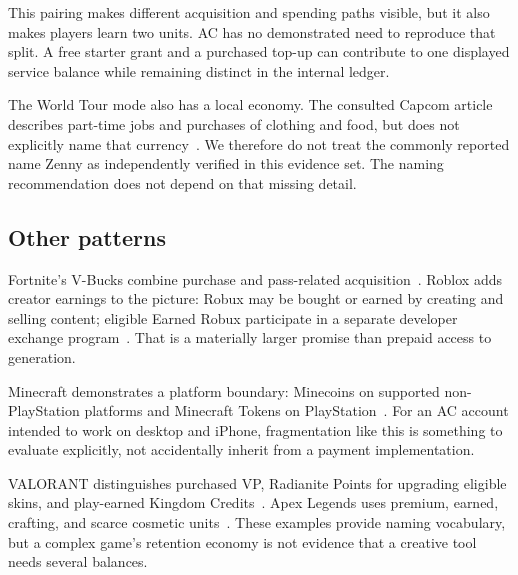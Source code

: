 \documentclass[10pt,letterpaper,twocolumn]{article}
\begin{document}
This pairing makes different acquisition and spending paths visible, but it also makes players learn two units. AC has no demonstrated need to reproduce that split. A free starter grant and a purchased top-up can contribute to one displayed service balance while remaining distinct in the internal ledger.

The World Tour mode also has a local economy. The consulted Capcom article describes part-time jobs and purchases of clothing and food, but does not explicitly name that currency~\cite{sfeditions}. We therefore do not treat the commonly reported name Zenny as independently verified in this evidence set. The naming recommendation does not depend on that missing detail.

\subsection{Other patterns}
Fortnite's V-Bucks combine purchase and pass-related acquisition~\cite{fortnite}. Roblox adds creator earnings to the picture: Robux may be bought or earned by creating and selling content; eligible Earned Robux participate in a separate developer exchange program~\cite{roblox}. That is a materially larger promise than prepaid access to generation.

Minecraft demonstrates a platform boundary: Minecoins on supported non-PlayStation platforms and Minecraft Tokens on PlayStation~\cite{minecraft,minecraftps}. For an AC account intended to work on desktop and iPhone, fragmentation like this is something to evaluate explicitly, not accidentally inherit from a payment implementation.

VALORANT distinguishes purchased VP, Radianite Points for upgrading eligible skins, and play-earned Kingdom Credits~\cite{valorant,kingdom}. Apex Legends uses premium, earned, crafting, and scarce cosmetic units~\cite{apex}. These examples provide naming vocabulary, but a complex game's retention economy is not evidence that a creative tool needs several balances.
\end{document}
